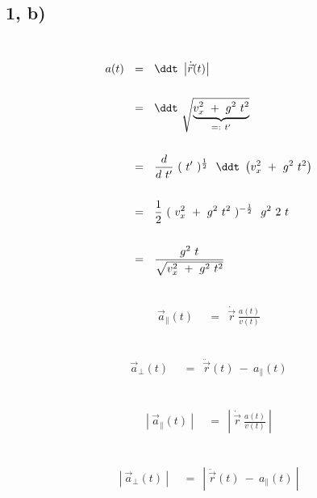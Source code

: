 \subsection*{1, b)}

~\\


\begin{align*}
	a(t) ~~ &= ~~ \ddt ~ \left| \dot{\vec{r}}(t) \right| \\ \\
	&= ~~ \ddt ~ \sqrt{ \underbrace{ v_x^2 ~ + ~ g^2 ~ t^2 }_{=: ~ t'} } \\ \\
	&= ~~ \frac{d}{d ~ t'} ~ ( ~ t' ~ )^{\frac{1}{2}} ~~ \ddt ~ \left( v_x^2 ~ + ~ g^2 ~ t^2 \right) \\ \\
	&= ~~ \frac{1}{2} ~ ( ~ v_x^2 ~ + ~ g^2 ~ t^2 ~ )^{-\frac{1}{2}} ~~ g^2 ~ 2 ~ t \\ \\
	&= ~~ \frac{g^2 ~ t}{\sqrt{v_x^2 ~ + ~ g^2 ~ t^2}}
\end{align*}

~\\

\begin{align*}
	\vec{a}_{\parallel}(t) ~~ &= ~~ \dot{\vec{r}} ~ \frac{a(t)}{v(t)}
\end{align*}

~\\

\begin{align*}
	\vec{a}_{\perp}(t) ~~ &= ~~ \ddot{\vec{r}}(t) ~ - ~ a_{\parallel}(t)
\end{align*}

~\\

\begin{align*}
\left| ~ \vec{a}_{\parallel}(t) ~ \right| ~~ &= ~~ \left| ~ \dot{\vec{r}} ~ \frac{a(t)}{v(t)} ~ \right|
\end{align*}

~\\

\begin{align*}
\left| ~ \vec{a}_{\perp}(t) ~ \right| ~~ &= ~~ \left| ~ \ddot{\vec{r}}(t) ~ - ~ a_{\parallel}(t) ~ \right|
\end{align*}

~\\


